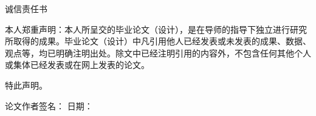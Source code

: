 \begin{center}
\songti{}诚信责任书
\end{center}
\vspace{1.5cm}

\begin{spacing}{1.885}
	\songti{}本人郑重声明：本人所呈交的毕业论文（设计），是在导师的指导下独立进行研究所取得的成果。毕业论文（设计）中凡引用他人已经发表或未发表的成果、数据、观点等，均已明确注明出处。除文中已经注明引用的内容外，不包含任何其他个人或集体已经发表或在网上发表的论文。
	
	特此声明。
\end{spacing}


\vspace{3cm}

\songti{}论文作者签名：\QHUunderline[60pt]{} \hfill 日期：\QHUunderline[120pt]{}




